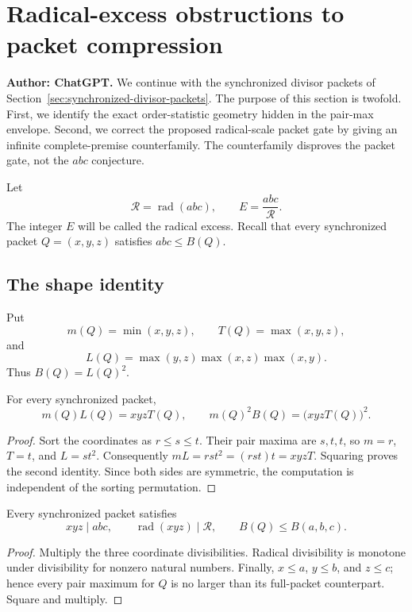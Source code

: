 \section{Radical-excess obstructions to packet compression}
\label{sec:packet-radical-excess-obstruction}

\noindent\textbf{Author: ChatGPT.}
We continue with the synchronized divisor packets of
Section~\ref{sec:synchronized-divisor-packets}.  The purpose of this section
is twofold.  First, we identify the exact order-statistic geometry hidden in
the pair-max envelope.  Second, we correct the proposed radical-scale packet
gate by giving an infinite complete-premise counterfamily.  The
counterfamily disproves the packet gate, not the $abc$ conjecture.

Let
\[
 \mathcal R=\operatorname{rad}(abc),\qquad E=\frac{abc}{\mathcal R}.
\]
The integer $E$ will be called the radical excess.  Recall that every
synchronized packet $Q=(x,y,z)$ satisfies $abc\le B(Q)$.

\subsection{The shape identity}

Put
\[
 m(Q)=\min(x,y,z),\qquad T(Q)=\max(x,y,z),
\]
and
\[
 L(Q)=\max(y,z)\max(x,z)\max(x,y).
\]
Thus $B(Q)=L(Q)^2$.

\begin{theorem}
\label{thm:packet-shape-identity}
For every synchronized packet,
\[
 m(Q)L(Q)=xyzT(Q),
 \qquad
 m(Q)^2B(Q)=\bigl(xyzT(Q)\bigr)^2.
\]
\end{theorem}

\begin{proof}
Sort the coordinates as $r\le s\le t$.  Their pair maxima are $s,t,t$,
so $m=r$, $T=t$, and $L=st^2$.  Consequently
$mL=rst^2=(rst)t=xyzT$.  Squaring proves the second identity.  Since both
sides are symmetric, the computation is independent of the sorting
permutation.
\end{proof}

\begin{proposition}
\label{prop:packet-support-envelope}
Every synchronized packet satisfies
\[
 xyz\mid abc,\qquad
 \operatorname{rad}(xyz)\mid \mathcal R,\qquad
 B(Q)\le B(a,b,c).
\]
\end{proposition}

\begin{proof}
Multiply the three coordinate divisibilities.  Radical divisibility is
monotone under divisibility for nonzero natural numbers.  Finally,
$x\le a$, $y\le b$, and $z\le c$; hence every pair maximum for $Q$ is no
larger than its full-packet counterpart.  Square and multiply.
\end{proof}

